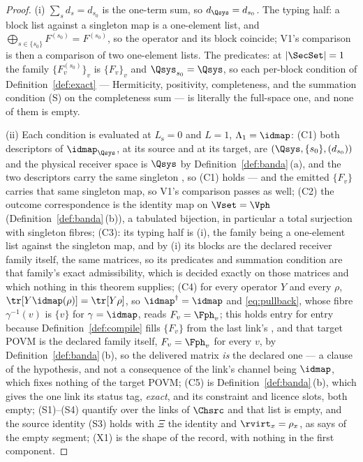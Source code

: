 \begin{proof}
(i) $\sum_sd_s=d_{s_0}$ is the one-term sum, so $d_{\Qsys}=d_{s_0}$. The
typing half: a block list against a singleton map is a one-element list, and
$\bigoplus_{s\in\{s_0\}}F^{(s_0)}=F^{(s_0)}$, so the operator and its block
coincide; V1's comparison is then a comparison of two one-element lists. The
predicates: at $|\SecSet|=1$ the family $\{F_v^{(s_0)}\}_v$ is $\{F_v\}_v$ and
$\Qsys_{s_0}=\Qsys$, so each per-block condition of
Definition~\ref{def:exact} --- Hermiticity, positivity, completeness, and the
summation condition (S) on the completeness sum --- is literally the full-space
one, and none of them is empty.

(ii) Each condition is evaluated at $L_{\mathrm s}=0$ and $L=1$,
$\Lambda_1=\idmap$: (C1) both descriptors of $\idmap_{\Qsys}$, at its source
and at its target, are $(\Qsys,\{s_0\},(d_{s_0}))$ and the physical receiver
space is $\Qsys$ by Definition~\ref{def:banda}\,(a), and the two descriptors
carry the same singleton , so (C1) holds --- and the emitted
$\{F_v\}$ carries that same singleton map, so V1's comparison passes as well;
(C2) the outcome correspondence is the identity map on $\Vset=\Vph$
(Definition~\ref{def:banda}\,(b)), a tabulated bijection, in particular a
total surjection with singleton fibres; (C3): its typing half is (i), the
family being a one-element list against the singleton map, and by (i) its
blocks are the declared receiver family itself, the same matrices, so its
predicates and summation condition are that family's exact admissibility,
which is decided exactly on those matrices and which nothing in this theorem
supplies; (C4) for every operator $Y$ and every
$\rho$, $\tr[Y\idmap(\rho)]=\tr[Y\rho]$, so $\idmap^{\dagger}=\idmap$ and
\eqref{eq:pullback}, whose fibre $\gamma^{-1}(v)$ is $\{v\}$ for
$\gamma=\idmap$, reads $F_v=\Fph_v$; this holds entry for entry because
Definition~\ref{def:compile} fills $\{F_v\}$ from the last link's
, and that target POVM is the declared family
itself, $F_v=\Fph_v$ for every $v$, by Definition~\ref{def:banda}\,(b), so
the delivered matrix \emph{is} the declared one --- a clause of the
hypothesis, and not a consequence of the link's channel being $\idmap$, which
fixes nothing of the target POVM; (C5) is Definition~\ref{def:banda}\,(b),
which gives the one link its status tag, \emph{exact}, and its constraint and
licence slots, both empty; (S1)--(S4) quantify over the links of
$\Chsrc$ and that list is empty, and the source identity (S3) holds with $\Xi$
the identity and $\rvirt_x=\rho_x$, as 
says of the empty segment; (X1) is the shape of the record, with nothing in
the first component.


\end{proof}
